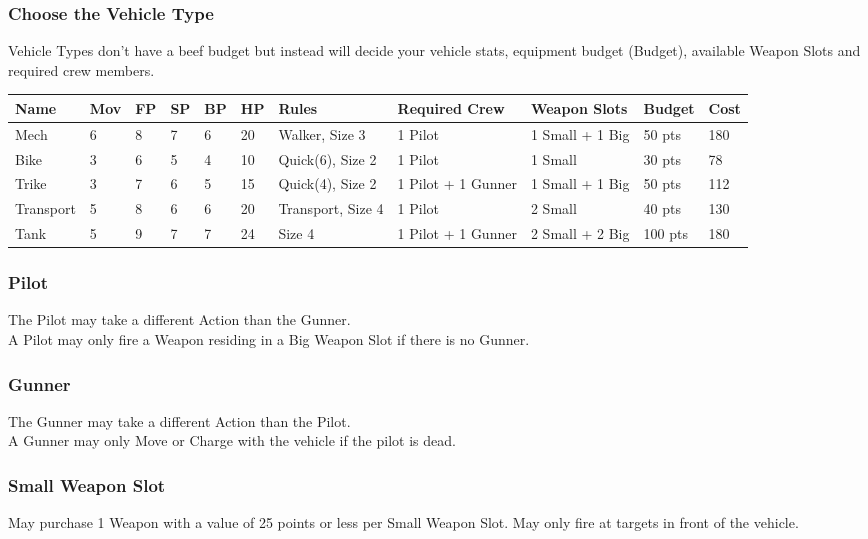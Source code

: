 \documentclass[
	11pt,
	toc=bibliography
	]{article}
\begin{document}
\subsubsection{Choose the Vehicle Type}
Vehicle Types don't have a beef budget but instead will decide your vehicle stats, equipment budget (Budget), available Weapon Slots and required crew members.
{\renewcommand{\arraystretch}{2}
\begin{longtable}{V{.1\textwidth}| V{.05\textwidth} V{.025\textwidth}V{.025\textwidth}V{.025\textwidth}V{.025\textwidth}V{.12\textwidth}V{.14\textwidth}V{.12\textwidth}V{.11\textwidth}V{.05\textwidth} }
\bf Name & \bf Mov & \bf FP & \bf SP & \bf BP & \bf HP &\bf Rules & \bf Required Crew & \bf Weapon Slots & \bf Budget & \bf Cost\\ 
\hline 
Mech & 6 & 8 & 7 & 6 & 20 & Walker, Size 3 & 1 Pilot & 1 Small + 1 Big & 50 pts & 180\\ 
Bike & 3 & 6 & 5 & 4 & 10 & Quick(6), Size 2 & 1 Pilot & 1 Small & 30 pts & 78\\ 
Trike & 3 & 7 & 6 & 5 & 15 & Quick(4), Size 2 & 1 Pilot + 1 Gunner & 1 Small + 1 Big & 50 pts & 112\\ 
Transport & 5 & 8 & 6 & 6 & 20 & Transport, Size 4 & 1 Pilot & 2 Small & 40 pts & 130\\ 
Tank & 5 & 9 & 7 & 7 & 24 & Size 4 & 1 Pilot + 1 Gunner & 2 Small + 2 Big & 100 pts & 180\\ 
\end{longtable}}

\subsubsection*{Pilot}
The Pilot may take a different Action than the Gunner. \\
A Pilot may only fire a Weapon residing in a Big Weapon Slot if there is no Gunner. \\

\subsubsection*{Gunner}
The Gunner may take a different Action than the Pilot. \\
A Gunner may only Move or Charge with the vehicle if the pilot is dead.

\subsubsection*{Small Weapon Slot}
May purchase 1 Weapon with a value of 25 points or less per Small Weapon Slot. May only fire at targets in front of the vehicle.
\end{document}
